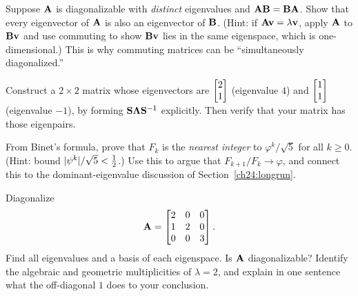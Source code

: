 \begin{exercise}
\label{ch24:ex-commute}
Suppose $\mathbf{A}$ is diagonalizable with \emph{distinct} eigenvalues and
$\mathbf{A}\mathbf{B} = \mathbf{B}\mathbf{A}$. Show that every eigenvector of $\mathbf{A}$ is
also an eigenvector of $\mathbf{B}$. (Hint: if $\mathbf{A}\mathbf{v} = \lambda\mathbf{v}$,
apply $\mathbf{A}$ to $\mathbf{B}\mathbf{v}$ and use commuting to show $\mathbf{B}\mathbf{v}$
lies in the same eigenspace, which is one-dimensional.) This is why commuting
matrices can be ``simultaneously diagonalized.''
\end{exercise}

\begin{exercise}
\label{ch24:ex-build}
Construct a $2\times2$ matrix whose eigenvectors are $\begin{bmatrix}2\\1\end{bmatrix}$ (eigenvalue
$4$) and $\begin{bmatrix}1\\1\end{bmatrix}$ (eigenvalue $-1$), by forming
$\mathbf{S}\mathbf{\Lambda}\mathbf{S}^{-1}$ explicitly. Then verify that your matrix has
those eigenpairs.
\end{exercise}

\begin{exercise}
\label{ch24:ex-fib-asymp}
From Binet's formula, prove that $F_k$ is the \emph{nearest integer} to
$\varphi^k/\sqrt5$ for all $k\ge0$. (Hint: bound $\lvert\psi^k\rvert/\sqrt5 <
\tfrac12$.) Use this to argue that $F_{k+1}/F_k \to \varphi$, and connect this to
the dominant-eigenvalue discussion of Section~\ref{ch24:longrun}.
\end{exercise}

\begin{exercise}
\label{ch24:ex-3x3}
Diagonalize
\[
  \mathbf{A} = \begin{bmatrix} 2 & 0 & 0 \\ 1 & 2 & 0 \\ 0 & 0 & 3 \end{bmatrix}.
\]
Find all eigenvalues and a basis of each eigenspace. Is $\mathbf{A}$ diagonalizable?
Identify the algebraic and geometric multiplicities of $\lambda = 2$, and explain
in one sentence what the off-diagonal $1$ does to your conclusion.
\end{exercise}
